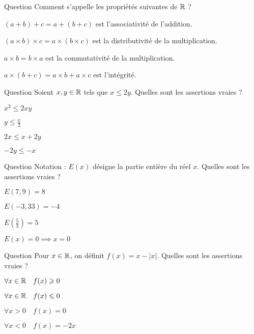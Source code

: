 \begin{multi}[multiple,feedback=
{\((a+b)+c=a+(b+c)\) est l'associativité de l'addition.
\((a \times b)\times c=a \times (b \times c)\) est l'associativité de la multiplication.
\(a \times b = b\times a\) est la commutativité de la multiplication.
\(a \times (b+c) = a\times b + a \times c\) est la distributivité de la multiplication  par rapport à l'addition.
}]{Question}
Comment s'appelle les propriétés suivantes de \(\mathbb{R}\) ?

    \item* \((a+b)+c=a+(b+c)\) est l'associativité de l'addition.
    \item \((a \times b) \times c=a \times (b \times c)\) est la distributivité de la multiplication.
    \item* \(a \times b = b\times a\) est la commutativité de la multiplication.
    \item \(a \times (b+c) = a\times b + a \times c\) est l'intégrité.
\end{multi}


\begin{multi}[multiple,feedback=
{Lorsque l'on multiplie par un nombre négatif alors le sens de l'inégalité change. Il faut faire attention lorsque l'on multiplie par \(x\), car le sens de l'inégalité est changé ou pas selon que \(x\) soit négatif ou positif !
}]{Question}
Soient \(x,y \in \mathbb{R}\) tels que \(x \le 2y\).
Quelles sont les assertions vraies ?

    \item \(x^2 \le 2xy\)
    \item \(y\le \frac{x}{2}\)
    \item* \(2x \le x+2y\)
    \item* \(-2y \le -x\)
\end{multi}


\begin{multi}[multiple,feedback=
{La partie entière de \(x\) est le plus grand entier, inférieur ou égal à \(x\).
}]{Question}
Notation : \(E(x)\) désigne la partie entière du réel \(x\).
Quelles sont les assertions vraies ?

    \item \(E(7,9) = 8\)
    \item* \(E(-3,33) = -4\)
    \item \(E(\frac{5}{3}) = 5\)
    \item \(E(x)=0 \implies x=0\)
\end{multi}


\begin{multi}[multiple,feedback=
{Si \(x \ge 0\), alors \(f(x)=0\). Si \(x<0\) alors \(-|x|=x\) et donc \(f(x)=2x<0\).
}]{Question}
Pour \(x\in\mathbb{R}\), on définit \(f(x)= x - |x|\).
Quelles sont les assertions vraies ?

    \item \(\forall x \in \mathbb{R} \quad f(x)\geqslant0\)
    \item* \(\forall x \in \mathbb{R} \quad f(x)\leqslant0\)
    \item* \(\forall x >0 \quad f(x) =  0\)
    \item \(\forall x < 0 \quad f(x) =  -2x\)
\end{multi}


